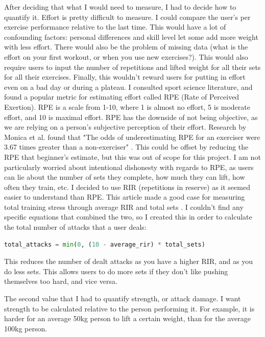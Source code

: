 \documentclass{l4proj}
\begin{document}
After deciding that what I would need to measure, I had to decide how to quantify it. Effort is pretty difficult to measure. I could compare the user's per exercise performance relative to the last time. This would have a lot of confounding factors: personal differences and skill level let some add more weight with less effort. There would also be the problem of missing data (what is the effort on your first workout, or when you use new exercises?). This would also require users to input the number of repetitions and lifted weight for all their sets for all their exercises. Finally, this wouldn't reward users for putting in effort even on a bad day or during a plateau. I consulted sport science literature, and found a popular metric for estimating effort called RPE (Rate of Perceived Exertion). RPE is a scale from 1-10, where 1 is almost no effort, 5 is moderate effort, and 10 is maximal effort. RPE has the downside of not being objective, as we are relying on a person's subjective perception of their effort. Research by Monica et al. found that "The odds of underestimating RPE for an exerciser were 3.67 times greater than a non-exerciser" \cite{RPE_estimations}. This could be offset by reducing the RPE that beginner's estimate, but this was out of scope for this project. I am not particularly worried about intentional dishonesty with regards to RPE, as users can lie about the number of sets they complete, how much they can lift, how often they train, etc. I decided to use RIR (repetitions in reserve) as it seemed easier to understand than RPE. This article \cite{rir} made a good case for measuring total training stress through average RIR and total sets . I couldn't find any specific equations that combined the two, so I created this in order to calculate the total number of attacks that a user deals: 

\begin{lstlisting}[language=python, caption={Total of number of granted attacks based on average RIR and total sets}]
total_attacks = min(0, (10 - average_rir) * total_sets)
\end{lstlisting}

This reduces the number of dealt attacks as you have a higher RIR, and as you do less sets. This allows users to do more sets if they don't like pushing themselves too hard, and vice versa. 

The second value that I had to quantify strength, or attack damage. I want strength to be calculated relative to the person performing it. For example, it is harder for an average 50kg person to lift a certain weight, than for the average 100kg person.
\end{document}
